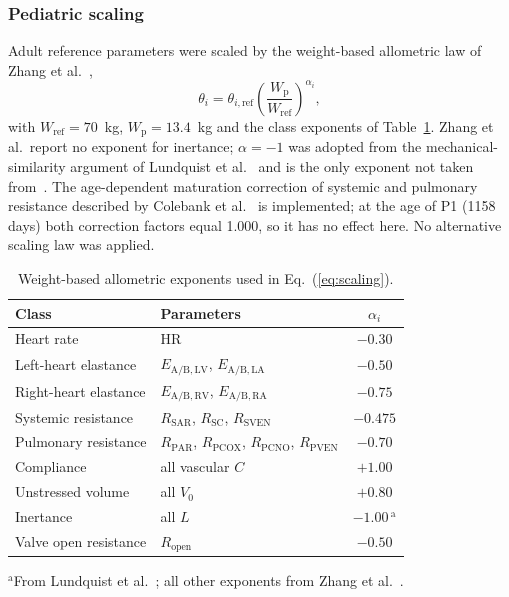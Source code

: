 \subsubsection{Pediatric scaling}
Adult reference parameters were scaled by the weight-based allometric law of Zhang et al.~\cite{zhang2019multiscale},
\begin{equation}
\theta_i = \theta_{i,\mathrm{ref}} \left(\frac{W_{\mathrm{p}}}{W_{\mathrm{ref}}}\right)^{\alpha_i},
\label{eq:scaling}
\end{equation}
with $W_{\mathrm{ref}} = 70$~kg, $W_{\mathrm{p}} = 13.4$~kg and the class exponents of Table~\ref{tab:exponents}. Zhang et al.\ report no exponent for inertance; $\alpha = -1$ was adopted from the mechanical-similarity argument of Lundquist et al.~\cite{Lundquist2025} and is the only exponent not taken from~\cite{zhang2019multiscale}. The age-dependent maturation correction of systemic and pulmonary resistance described by Colebank et al.~\cite{Colebank2026} is implemented; at the age of P1 (1158 days) both correction factors equal 1.000, so it has no effect here. No alternative scaling law was applied.

\begin{table}[ht]
\centering\small
\caption{Weight-based allometric exponents used in Eq.~(\ref{eq:scaling}).}
\label{tab:exponents}
\begin{tabular}{llc}
\toprule
\textbf{Class} & \textbf{Parameters} & $\alpha_i$ \\
\midrule
Heart rate & HR & $-0.30$ \\
Left-heart elastance & $E_{\mathrm{A/B,LV}}$, $E_{\mathrm{A/B,LA}}$ & $-0.50$ \\
Right-heart elastance & $E_{\mathrm{A/B,RV}}$, $E_{\mathrm{A/B,RA}}$ & $-0.75$ \\
Systemic resistance & $R_{\mathrm{SAR}}$, $R_{\mathrm{SC}}$, $R_{\mathrm{SVEN}}$ & $-0.475$ \\
Pulmonary resistance & $R_{\mathrm{PAR}}$, $R_{\mathrm{PCOX}}$, $R_{\mathrm{PCNO}}$, $R_{\mathrm{PVEN}}$ & $-0.70$ \\
Compliance & all vascular $C$ & $+1.00$ \\
Unstressed volume & all $V_0$ & $+0.80$ \\
Inertance & all $L$ & $-1.00$\,$^{\mathrm{a}}$ \\
Valve open resistance & $R_{\mathrm{open}}$ & $-0.50$ \\
\bottomrule
\end{tabular}
\par\vspace{2pt}
\footnotesize{$^{\mathrm{a}}$From Lundquist et al.~\cite{Lundquist2025}; all other exponents from Zhang et al.~\cite{zhang2019multiscale}.}
\end{table}

